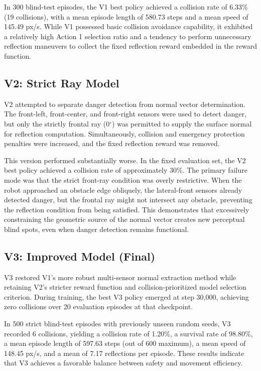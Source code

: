 \documentclass[conference]{IEEEtran}
\begin{document}
In 300 blind-test episodes, the V1 best policy achieved a collision rate of 6.33\% (19 collisions), with a mean episode length of 580.73 steps and a mean speed of 145.49 px/s. While V1 possessed basic collision avoidance capability, it exhibited a relatively high Action 1 selection ratio and a tendency to perform unnecessary reflection maneuvers to collect the fixed reflection reward embedded in the reward function.

\subsection{V2: Strict Ray Model}

V2 attempted to separate danger detection from normal vector determination. The front-left, front-center, and front-right sensors were used to detect danger, but only the strictly frontal ray (0$^\circ$) was permitted to supply the surface normal for reflection computation. Simultaneously, collision and emergency protection penalties were increased, and the fixed reflection reward was removed.

This version performed substantially worse. In the fixed evaluation set, the V2 best policy achieved a collision rate of approximately 30\%. The primary failure mode was that the strict front-ray condition was overly restrictive. When the robot approached an obstacle edge obliquely, the lateral-front sensors already detected danger, but the frontal ray might not intersect any obstacle, preventing the reflection condition from being satisfied. This demonstrates that excessively constraining the geometric source of the normal vector creates new perceptual blind spots, even when danger detection remains functional.

\subsection{V3: Improved Model (Final)}

V3 restored V1's more robust multi-sensor normal extraction method while retaining V2's stricter reward function and collision-prioritized model selection criterion. During training, the best V3 policy emerged at step 30,000, achieving zero collisions over 20 evaluation episodes at that checkpoint.

In 500 strict blind-test episodes with previously unseen random seeds, V3 recorded 6 collisions, yielding a collision rate of 1.20\%, a survival rate of 98.80\%, a mean episode length of 597.63 steps (out of 600 maximum), a mean speed of 148.45 px/s, and a mean of 7.17 reflections per episode. These results indicate that V3 achieves a favorable balance between safety and movement efficiency.
\end{document}
